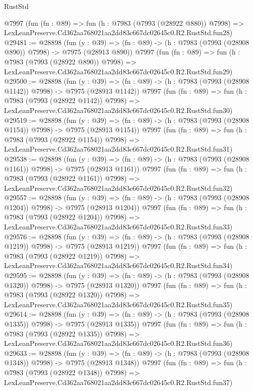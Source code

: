 \begin{lexlean}{RustStd}
\begin{coremodule}
    @7997
    (fun (fn : @89) =>
    fun (h : @7983 (@7993 (@28922 @880)) @7998) =>
    LexLeanPreserve.Cd362aa768021aa2dd83c667dc02645c0.R2.RustStd.fun28)
@29481 := @28898
    (fun (y : @39) => (fn : @89) -> (h : @7983 (@7993 (@28908 @890)) @7998) -> @7975 (@28913 @890))
    @7997
    (fun (fn : @89) =>
    fun (h : @7983 (@7993 (@28922 @890)) @7998) =>
    LexLeanPreserve.Cd362aa768021aa2dd83c667dc02645c0.R2.RustStd.fun29)
@29500 := @28898
    (fun (y : @39) =>
    (fn : @89) -> (h : @7983 (@7993 (@28908 @1142)) @7998) -> @7975 (@28913 @1142))
    @7997
    (fun (fn : @89) =>
    fun (h : @7983 (@7993 (@28922 @1142)) @7998) =>
    LexLeanPreserve.Cd362aa768021aa2dd83c667dc02645c0.R2.RustStd.fun30)
@29519 := @28898
    (fun (y : @39) =>
    (fn : @89) -> (h : @7983 (@7993 (@28908 @1154)) @7998) -> @7975 (@28913 @1154))
    @7997
    (fun (fn : @89) =>
    fun (h : @7983 (@7993 (@28922 @1154)) @7998) =>
    LexLeanPreserve.Cd362aa768021aa2dd83c667dc02645c0.R2.RustStd.fun31)
@29538 := @28898
    (fun (y : @39) =>
    (fn : @89) -> (h : @7983 (@7993 (@28908 @1161)) @7998) -> @7975 (@28913 @1161))
    @7997
    (fun (fn : @89) =>
    fun (h : @7983 (@7993 (@28922 @1161)) @7998) =>
    LexLeanPreserve.Cd362aa768021aa2dd83c667dc02645c0.R2.RustStd.fun32)
@29557 := @28898
    (fun (y : @39) =>
    (fn : @89) -> (h : @7983 (@7993 (@28908 @1204)) @7998) -> @7975 (@28913 @1204))
    @7997
    (fun (fn : @89) =>
    fun (h : @7983 (@7993 (@28922 @1204)) @7998) =>
    LexLeanPreserve.Cd362aa768021aa2dd83c667dc02645c0.R2.RustStd.fun33)
@29576 := @28898
    (fun (y : @39) =>
    (fn : @89) -> (h : @7983 (@7993 (@28908 @1219)) @7998) -> @7975 (@28913 @1219))
    @7997
    (fun (fn : @89) =>
    fun (h : @7983 (@7993 (@28922 @1219)) @7998) =>
    LexLeanPreserve.Cd362aa768021aa2dd83c667dc02645c0.R2.RustStd.fun34)
@29595 := @28898
    (fun (y : @39) =>
    (fn : @89) -> (h : @7983 (@7993 (@28908 @1320)) @7998) -> @7975 (@28913 @1320))
    @7997
    (fun (fn : @89) =>
    fun (h : @7983 (@7993 (@28922 @1320)) @7998) =>
    LexLeanPreserve.Cd362aa768021aa2dd83c667dc02645c0.R2.RustStd.fun35)
@29614 := @28898
    (fun (y : @39) =>
    (fn : @89) -> (h : @7983 (@7993 (@28908 @1335)) @7998) -> @7975 (@28913 @1335))
    @7997
    (fun (fn : @89) =>
    fun (h : @7983 (@7993 (@28922 @1335)) @7998) =>
    LexLeanPreserve.Cd362aa768021aa2dd83c667dc02645c0.R2.RustStd.fun36)
@29633 := @28898
    (fun (y : @39) =>
    (fn : @89) -> (h : @7983 (@7993 (@28908 @1348)) @7998) -> @7975 (@28913 @1348))
    @7997
    (fun (fn : @89) =>
    fun (h : @7983 (@7993 (@28922 @1348)) @7998) =>
    LexLeanPreserve.Cd362aa768021aa2dd83c667dc02645c0.R2.RustStd.fun37)

\end{coremodule}
\end{lexlean}
